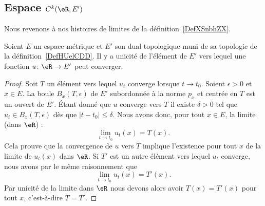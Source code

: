 \subsection{Espace \texorpdfstring{\(  C^k(\eR,E')\)}{C(R,E')}}

Nous revenons à nos histoires de limites de la définition~\ref{DefXSnbhZX}.
\begin{proposition} \label{PropRBCiHbz}
	Soient \( E\) un espace métrique et \( E'\) son dual topologique muni de sa topologie de la définition~\ref{DefHUelCDD}. Il y a unicité de l'élément de \( E'\) vers lequel une fonction \( u\colon \eR\to E' \) peut converger.
\end{proposition}

\begin{proof}
	Soit \( T\) un élément vers lequel \( u_t\) converge lorsque \( t\to t_0\). Soient \( \epsilon>0\) et \( x\in E\). La boule \( B_x(T,\epsilon)\) de \( E'\) subordonnée à la norme \( p_x\) et centrée en \( T\) est un ouvert de \( E'\). Étant donné que \( u\) converge vers \( T\) il existe \( \delta>0\) tel que \( u_t\in B_x(T,\epsilon)\) dès que \( | t-t_0 |\leq \delta\). Nous avons donc, pour tout \( x\in E\), la limite (dans \( \eR\)) :
	\begin{equation}
		\lim_{t\to t_0} u_t(x)=T(x).
	\end{equation}
	Cela prouve que la convergence de \( u\) vers \( T\) implique l'existence pour tout \( x\) de la limite de \( u_t(x)\) dans \( \eR\). Si \( T'\) est un autre élément vers lequel \( u_t\) converge, nous avons par le même raisonnement que
	\begin{equation}
		\lim_{t\to t_0} u_t(x)=T'(x).
	\end{equation}
	Par unicité de la limite dans \( \eR\)
	nous devons alors avoir \( T(x)=T'(x)\) pour tout \( x\), c'est-à-dire \( T=T'\).
\end{proof}


